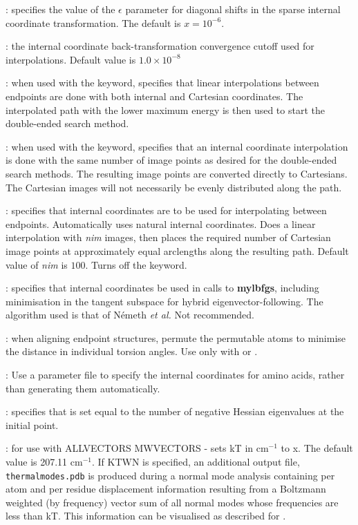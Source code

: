 {{: specifies the value of the $\epsilon$ parameter
for diagonal shifts in the sparse internal coordinate transformation.
The default is $x=10^{-6}$.

: the internal coordinate back-transformation
  convergence cutoff used for interpolations. Default
  value is $1.0\times10^{-8}$

: when used with the {} keyword,
  specifies that linear interpolations between endpoints are done with both
  internal and Cartesian coordinates. The interpolated path with the lower
  maximum energy is then used to start the double-ended search method.

: when used with the {} keyword,
  specifies that an internal coordinate interpolation is done with the same
  number of image points as desired for the double-ended search methods. The
  resulting image points are converted directly to Cartesians. The Cartesian
  images will not necessarily be evenly distributed along the path.

: specifies that internal coordinates are to be
  used for interpolating between
  endpoints. Automatically uses natural internal coordinates. Does a linear
  interpolation with {\it nim\/} images, then places the required number of
  Cartesian image points at approximately equal arclengths along the resulting
  path. Default value of {\it nim\/} is $100$. Turns off the {} keyword.

: specifies that internal coordinates be used in calls to {\bf mylbfgs},
including minimisation in the tangent subspace for hybrid eigenvector-following.
The algorithm used is that of N\'emeth {\it et al.\/}\cite{NemethCMA00}
Not recommended.

: when aligning endpoint structures, permute the
  permutable atoms to minimise the distance in individual torsion angles. Use
  only with {} or {}.

: Use a parameter file to specify the internal
  coordinates for amino acids, rather than generating them automatically. 

: specifies that {} is set equal to
      the number of negative Hessian eigenvalues at the initial point.

: for use with { ALLVECTORS MWVECTORS} - sets kT in cm$^{-1}$ to x. The default value is 207.11 cm$^{-1}$. If KTWN is specified, an additional output file, {\tt thermalmodes.pdb} is produced during a normal mode analysis containing per atom and per residue displacement information resulting from a Boltzmann weighted (by frequency) vector sum of all normal modes whose frequencies are less than kT. This information can be visualised as described for {}.




}}
